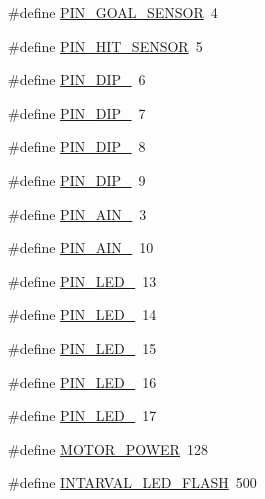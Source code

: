 \begin{DoxyCompactItemize}
\item 
\#define \mbox{\hyperlink{iraira__bo__up__down_8ino_a04bd3af8e0d78c7fb2a066085fb8ed19}{P\+I\+N\+\_\+\+G\+O\+A\+L\+\_\+\+S\+E\+N\+S\+OR}}~4
\item 
\#define \mbox{\hyperlink{iraira__bo__up__down_8ino_a4d3004c75c745c0b097de0dfea5e52de}{P\+I\+N\+\_\+\+H\+I\+T\+\_\+\+S\+E\+N\+S\+OR}}~5
\item 
\#define \mbox{\hyperlink{iraira__bo__up__down_8ino_a1865ea46eaf057c61c9661e6777e617b}{P\+I\+N\+\_\+\+D\+I\+P\+\_}}~6
\item 
\#define \mbox{\hyperlink{iraira__bo__up__down_8ino_aad6f8823636ffe5bee61d57219a18f53}{P\+I\+N\+\_\+\+D\+I\+P\+\_}}~7
\item 
\#define \mbox{\hyperlink{iraira__bo__up__down_8ino_af0b38ba5f8b9c96b3a1f03b00382739c}{P\+I\+N\+\_\+\+D\+I\+P\+\_}}~8
\item 
\#define \mbox{\hyperlink{iraira__bo__up__down_8ino_a2d393a9dffb71739bd6aa98a0eb94e76}{P\+I\+N\+\_\+\+D\+I\+P\+\_}}~9
\item 
\#define \mbox{\hyperlink{iraira__bo__up__down_8ino_a54103bbaebaebd27b24906bbefd36e18}{P\+I\+N\+\_\+\+A\+I\+N\+\_}}~3
\item 
\#define \mbox{\hyperlink{iraira__bo__up__down_8ino_adf28ad9e2dd0fdecf6d50a65b63bff39}{P\+I\+N\+\_\+\+A\+I\+N\+\_}}~10
\item 
\#define \mbox{\hyperlink{iraira__bo__up__down_8ino_af1ab79f4742613cc2f7f472d9d6c6570}{P\+I\+N\+\_\+\+L\+E\+D\+\_}}~13
\item 
\#define \mbox{\hyperlink{iraira__bo__up__down_8ino_a0856e6b89a9e5cb8a8bbbf6ba9f7dccc}{P\+I\+N\+\_\+\+L\+E\+D\+\_}}~14
\item 
\#define \mbox{\hyperlink{iraira__bo__up__down_8ino_afac55df431f2832acd5b0afa6f56cbc1}{P\+I\+N\+\_\+\+L\+E\+D\+\_}}~15
\item 
\#define \mbox{\hyperlink{iraira__bo__up__down_8ino_a1fffd93d20b6fe777713bd58125e3e0b}{P\+I\+N\+\_\+\+L\+E\+D\+\_}}~16
\item 
\#define \mbox{\hyperlink{iraira__bo__up__down_8ino_a6581c9faeb95d91f151a7fda5ff9d963}{P\+I\+N\+\_\+\+L\+E\+D\+\_}}~17
\item 
\#define \mbox{\hyperlink{iraira__bo__up__down_8ino_aac54a414e7b061922e16432c9437e6b8}{M\+O\+T\+O\+R\+\_\+\+P\+O\+W\+ER}}~128
\item 
\#define \mbox{\hyperlink{iraira__bo__up__down_8ino_a6e499958b5cdf86ac62e20b22bbb4bcc}{I\+N\+T\+A\+R\+V\+A\+L\+\_\+\+L\+E\+D\+\_\+\+F\+L\+A\+SH}}~500
\end{DoxyCompactItemize}
